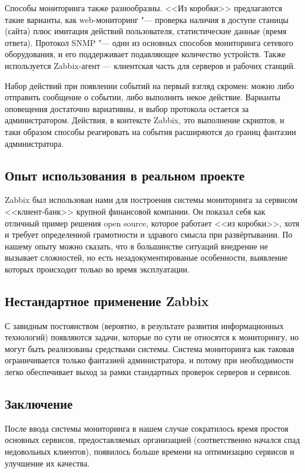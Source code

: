 \documentclass[10pt, a5paper]{article}
\begin{document}
Способы мониторинга также разнообразны. <<Из коробки>> предлагаются такие варианты, как web-мониторинг "--- проверка наличия в доступе станицы (сайта) плюс имитация действий пользователя, статистические данные (время ответа). Протокол SNMP "--- один из основных способов мониторинга сетевого оборудования, и его поддерживает подавляющее количество устройств. Также используется Zabbix-агент — клиентская часть для серверов и рабочих станций.

Набор действий при появлении событий на первый взгляд скромен: можно либо отправить сообщение о событии, либо выполнить некое действие. Варианты оповещения достаточно вариативны, и выбор протокола остается за администратором. Действия, в контексте Zabbix, это выполнение скриптов, и таки образом способы реагировать на события расширяются до границ фантазии администратора.

\subsection*{Опыт использования в реальном проекте}

Zabbix был использован нами для построения системы мониторинга за сервисом <<клиент-банк>> крупной  финансовой компании. Он показал себя как отличный пример  решения open source, которое работает <<из коробки>>, хотя и требует определенной грамотности и здравого смысла при развёртывании. По нашему опыту можно сказать, что в большинстве ситуаций внедрение не вызывает сложностей, но есть незадокументированые особенности, выявление которых происходит только во время эксплуатации.

\subsection*{Нестандартное применение Zabbix}

С завидным постоянством (вероятно, в результате развития информационных технологий) появляются задачи, которые по сути не относятся к мониторингу, но могут быть реализованы средствами системы. Система мониторинга как таковая ограничивается только  фантазией администратора, и потому при необходимости легко обеспечивает выход за рамки стандартных проверок серверов и сервисов.

\subsection*{Заключение}

После ввода системы мониторинга в нашем случае сократилось время простоя основных сервисов, предоставляемых организацией (соответственно начался спад недовольных клиентов), появилось больше времени на оптимизацию сервисов и улучшение их качества.
\end{document}

